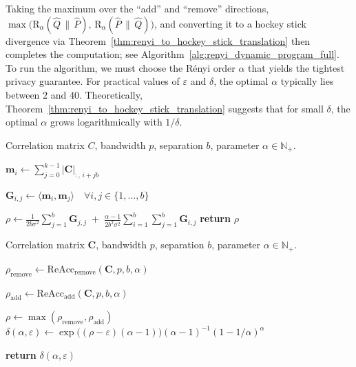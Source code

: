 \documentclass{article}
\theoremstyle{plain}
\theoremstyle{definition}
\theoremstyle{remark}
\renewcommand{\epsilon}{\varepsilon}
\begin{document}
Taking the maximum over the ``add'' and ``remove'' directions, $
\max\!\bigl(\mathrm{R}_{\alpha}(\hat{Q}\,\|\,\hat{P}),\,\mathrm{R}_{\alpha}(\hat{P}\,\|\,\hat{Q})\bigr)$, and converting it to a  hockey stick divergence via Theorem~\ref{thm:renyi_to_hockey_stick_translation} then completes the computation; see Algorithm~\ref{alg:renyi_dynamic_program_full}. To run the algorithm, we must choose the R\'enyi order $\alpha$ that yields the tightest privacy guarantee. For practical values of $\epsilon$ and $\delta$, the optimal $\alpha$ typically lies between $2$ and $40$. Theoretically, Theorem~\ref{thm:renyi_to_hockey_stick_translation} suggests that for small $\delta$, the optimal $\alpha$ grows logarithmically with $1/\delta$.



\begin{algorithm}[t!]
\caption{Rényi Accountant ``add'' direction}
\label{alg:renyi_dynamic_program_remove}
\begin{algorithmic}[1]

\REQUIRE Correlation matrix $C$, bandwidth $p$, separation $b$, parameter $\alpha \in \mathbb{N}_{+}$.

\STATE $\mathbf{m}_i \leftarrow \sum_{j=0}^{k-1} |\mathbf{C}|_{:,\, i + jb}$

\STATE $\mathbf{G}_{i,j} \leftarrow \langle \mathbf{m}_i, \mathbf{m}_j \rangle \quad \forall i,j \in \{1,\dots,b\}$

\STATE $\rho \leftarrow \frac{1}{2b\sigma^2} \sum_{j = 1}^b \mathbf{G}_{j,j}
    \;+\;
    \frac{\alpha - 1}{2b^2\sigma^2} \sum_{i = 1}^b \sum_{j = 1}^b \mathbf{G}_{i,j}$
\STATE \textbf{return} $\rho$
\end{algorithmic}
\end{algorithm}

\begin{algorithm}[t!]
\caption{Rényi Accountant Full Algorithm}
\label{alg:renyi_dynamic_program_full}
\begin{algorithmic}[1]

\REQUIRE Correlation matrix $\mathbf{C}$, bandwidth $p$, separation $b$, parameter $\alpha \in \mathbb{N}_{+}$.

\STATE $\rho_{\mathrm{remove}} \leftarrow \mathrm{ReAcc_{remove}}(\mathbf{C}, p, b, \alpha)$ \qquad \quad \, 

\STATE $\rho_{\mathrm{add}} \leftarrow \mathrm{ReAcc_{add}}(\mathbf{C}, p, b, \alpha)$ \quad {}

\STATE $\rho \leftarrow \max(\rho_{\mathrm{remove}}, \rho_{\mathrm{add}})$
\STATE
$\delta(\alpha,\varepsilon) \leftarrow
\exp\!\big((\rho-\varepsilon)(\alpha-1)\big)
(\alpha-1)^{-1}(1-1/\alpha)^\alpha$

\STATE \textbf{return} $\delta(\alpha,\varepsilon)$
\end{algorithmic}
\end{algorithm}
\end{document}
